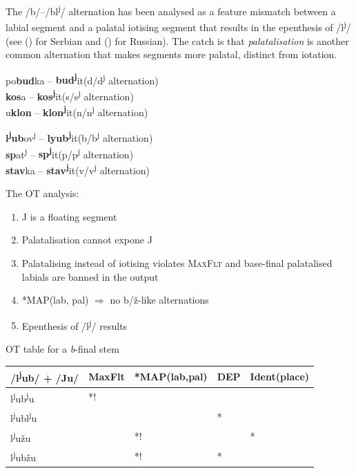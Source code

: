 \documentclass[a4paper, 12pt]{article}
\newcommand{\citeay}[2][]{\citeauthor{#2} (\citeyear[#1]{#2})}
\begin{document}
	\noindent The /b/--/bl\textsuperscript{j}/ alternation has been analysed as a feature mismatch between a labial segment and a palatal iotising segment that results in the epenthesis of /l\textsuperscript{j}/ (see \citeay{moren2006} for Serbian and \citeay{magomedova2017} for Russian). The catch is that \emph{palatalisation} is another common alternation that makes segments more palatal, distinct from iotation.
	
\begin{minipage}[t]{0.47\linewidth}
	\ex[aboveexskip=.7em]\label{t:pltz}po\textbf{bud}ka -- \textbf{bud\textsuperscript{j}}it\hfill(d/d\textsuperscript{j} alternation)\\
		\textbf{kos}a -- \textbf{kos\textsuperscript{j}}it\hfill (s/s\textsuperscript{j} alternation)\\
		u\textbf{klon}  -- \textbf{klon\textsuperscript{j}}it\hfill(n/n\textsuperscript{j} alternation)
	\xe
\end{minipage}
\hfill
\begin{minipage}[t]{0.45\linewidth}
	\ex[aboveexskip=.7em]\label{t:pltz-end}\textbf{l\textsuperscript{j}ub}ov\textsuperscript{j} -- \textbf{lyub\textsuperscript{j}}it\hfill(b/b\textsuperscript{j}  alternation)\\
		\textbf{sp}at\textsuperscript{j}  -- \textbf{sp\textsuperscript{j}}it\hfill(p/p\textsuperscript{j}  alternation)\\
		\textbf{stav}ka  -- \textbf{stav\textsuperscript{j}}it\hfill(v/v\textsuperscript{j}  alternation)
	\xe
\end{minipage}

	\noindent The OT analysis:
	
\begin{enumerate}[$\gg$]
	\item J is a floating segment
	\item Palatalisation cannot expone J
	\item Palatalising instead of iotising violates \textsc{MaxFlt} and base-final palatalised labials are banned in the output
	\item *\textsc{MAP}(lab, pal) $\Rightarrow$ no b/ž-like alternations
	\item Epenthesis of /l\textsuperscript{j}/ results
\end{enumerate}

	\ex\label{ex:tableb}OT table for a \textit{b}-final stem\\ 
\begin{tabular}{|l|l|l|l|l|}
\hline
/l\textsuperscript{j}ub/ + /Ju/ & {\sc MaxFlt} & *MAP(lab,pal) & DEP & {\sc Ident}(place) \\ \hline
l\textsuperscript{j}ub\textsuperscript{j}u        & *!     &               &     &              \\ \hline
\HandRight{} l\textsuperscript{j}ubl\textsuperscript{j}u       &        &               & *   &              \\ \hline
l\textsuperscript{j}užu         &        & *!            &     & *            \\ \hline
l\textsuperscript{j}ubžu        &        & *!            & *   &              \\ \hline
\end{tabular}
	\xe
	
\end{document}
